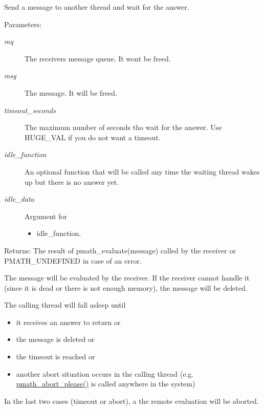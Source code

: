 Send a message to another thread and wait for the answer. 

\begin{Desc}
\item[Parameters:]
\begin{description}
\item[{\em mq}]The receivers message queue. It wont be freed. \item[{\em msg}]The message. It will be freed. \item[{\em timeout\_\-seconds}]The maximum number of seconds tho wait for the answer. Use HUGE\_\-VAL if you do not want a timeout. \item[{\em idle\_\-function}]An optional function that will be called any time the waiting thread wakes up but there is no answer yet. \item[{\em idle\_\-data}]Argument for \begin{itemize}
\item idle\_\-function. \end{itemize}
\end{description}
\end{Desc}
\begin{Desc}
\item[Returns:]The result of pmath\_\-evaluate(message) called by the receiver or PMATH\_\-UNDEFINED in case of an error.\end{Desc}
The message will be evaluated by the receiver. If the receiver cannot handle it (since it is dead or there is not enough memory), the message will be deleted.

The calling thread will fall asleep until\begin{itemize}
\item it receives an answer to return or\item the message is deleted or\item the timeout is reached or\item another abort situation occurs in the calling thread (e.g. \hyperlink{group__threads_g84e45036b76764def6390af12d2070bf}{pmath\_\-abort\_\-please()} is called anywhere in the system)\end{itemize}


In the last two cases (timeout or abort), a the remote evaluation will be aborted.

